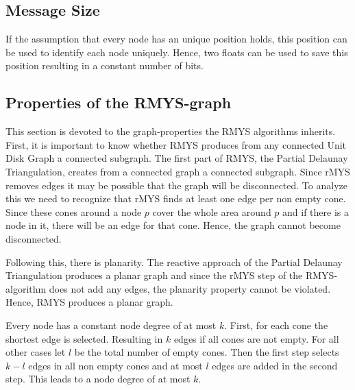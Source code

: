 \subsection{Message Size}
If the assumption that every node has an unique position holds, this position can be used to identify each node uniquely.
Hence, two floats can be used to save this position resulting in a constant number of bits.

\subsection{Properties of the RMYS-graph}
This section is devoted to the graph-properties the RMYS algorithms inherits.
First, it is important to know whether RMYS produces from any connected Unit Disk Graph a connected subgraph.
The first part of RMYS, the Partial Delaunay Triangulation, creates from a connected graph a connected subgraph.
Since rMYS removes edges it may be possible that the graph will be disconnected.
To analyze this we need to recognize that rMYS finds at least one edge per non empty cone.
Since these cones around a node $p $ cover the whole area around $p $ and if there is a node in it, there will be an edge for that cone. %
Hence, the graph cannot become disconnected. 

Following this, there is planarity.
The reactive approach of the Partial Delaunay Triangulation produces a planar graph and since the rMYS step of the RMYS-algorithm does not add any edges, the planarity property cannot be violated.
Hence, RMYS produces a planar graph.

Every node has a constant node degree of at most $k $.
First, for each cone the shortest edge is selected.
Resulting in $k $ edges if all cones are not empty.
For all other cases let $l $ be the total number of empty cones.
Then the first step selects $k-l $ edges in all non empty cones and at most $l $ edges are added in the second step.
This leads to a node degree of at most $k $.

